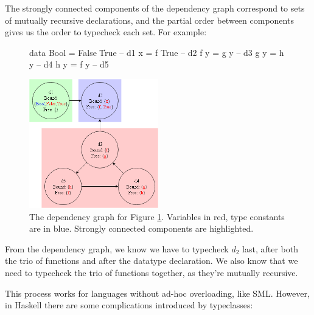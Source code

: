 \documentclass[dissertation.tex]{subfiles}
\begin{document}
{{{            The strongly connected components of the dependency graph correspond to sets of mutually recursive
            declarations, and the partial order between components gives us the order to typecheck each set. For
            example:

            \begin{figure}[H]
                \begin{haskellfigure}
                data Bool = False \| True   -- d1
                x = f True                  -- d2
                f y = g y                   -- d3
                g y = h y                   -- d4
                h y = f y                   -- d5
                \end{haskellfigure}
                \caption{}
                \label{code:dependency-graph}
            \end{figure}

            \begin{figure}[H]
                \includegraphics[width=0.5\textwidth]{figures/dependency_graph.png}
                \caption
                {
                    The dependency graph for Figure \ref{code:dependency-graph}. Variables in red, type
                    constants are in blue. Strongly connected components are highlighted.
                }
                \label{fig:dependency-graph}
            \end{figure}

            From the dependency graph, we know we have to typecheck \(d_2\) last, after both the trio of functions and
            after the datatype declaration. We also know that we need to typecheck the trio of functions together, as
            they're mutually recursive.

            This process works for languages without ad-hoc overloading, like SML. However, in Haskell there are some
            complications introduced by typeclasses:

}}}
\end{document}
